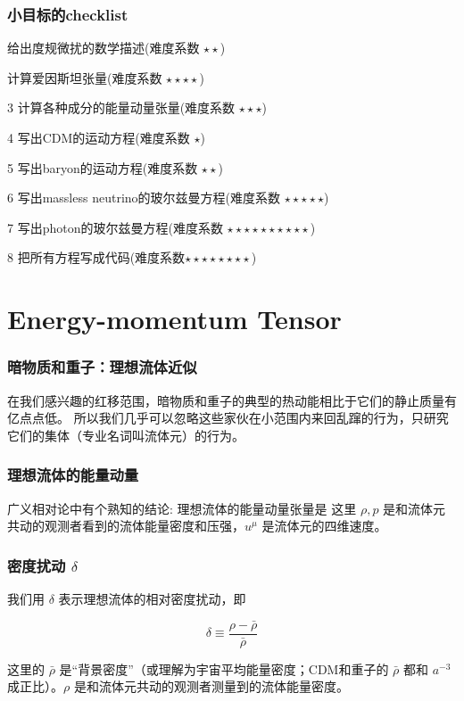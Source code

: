 \documentclass[CJK,13pt]{beamer}
\begin{document}
  \begin{frame}
    \frametitle{小目标的checklist}
    \bitem
  \item[\checkmark]{给出度规微扰的数学描述(难度系数 $\star\star$)}
  \item[\checkmark]{计算爱因斯坦张量(难度系数 $\star\star\star\star$)}
  \item[3]{计算各种成分的能量动量张量(难度系数 $\star\star\star$)}    
  \item[4]{写出CDM的运动方程(难度系数 $\star$)}
  \item[5]{写出baryon的运动方程(难度系数 $\star\star$)}        
  \item[6]{写出massless neutrino的玻尔兹曼方程(难度系数 $\star\star\star\star\star$)}
  \item[7]{写出photon的玻尔兹曼方程(难度系数 $\star\star\star\star\star\star\star\star\star\star$)}
  \item[8]{把所有方程写成代码(难度系数$\star\star\star\star\star\star\star\star$)}
    \eitem
  \end{frame}
  
  \section{Energy-momentum Tensor}

   \begin{frame}
    \frametitle{暗物质和重子：理想流体近似}
    在我们感兴趣的红移范围，暗物质和重子的典型的热动能相比于它们的静止质量有亿点点低。 所以我们几乎可以忽略这些家伙在小范围内来回乱蹿的行为，只研究它们的集体（专业名词叫流体元）的行为。

    \bcenter
        
    \ecenter

  \end{frame}


   \begin{frame}
     \frametitle{理想流体的能量动量}
     广义相对论中有个熟知的结论: 理想流体的能量动量张量是
     这里 $\rho, p$ 是和流体元共动的观测者看到的流体能量密度和压强，$u^\mu$ 是流体元的四维速度。
   \end{frame}


  \begin{frame}
    \frametitle{密度扰动 $\delta$}
    我们用 $\delta$ 表示理想流体的相对密度扰动，即

    {\blue $$\delta\equiv \frac{\rho - \bar{\rho}}{\bar{\rho}}$$}

    这里的 $\bar{\rho}$ 是“背景密度”（或理解为宇宙平均能量密度；CDM和重子的 $\bar{\rho}$ 都和 $a^{-3}$ 成正比）。$\rho$ 是和流体元共动的观测者测量到的流体能量密度。


  \end{frame}
\end{document}

